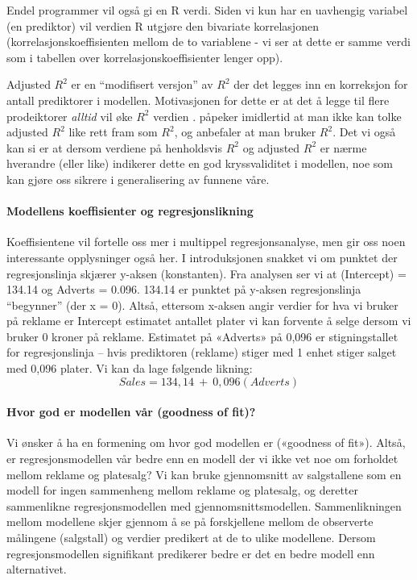 \documentclass[
]{article}
\begin{document}
Endel programmer vil også gi en R verdi. Siden vi kun har en uavhengig variabel (en prediktor) vil verdien R utgjøre den bivariate korrelasjonen (korrelasjonskoeffisienten mellom de to variablene - vi ser at dette er samme verdi som i tabellen over korrelasjonskoeffisienter lenger opp).

Adjusted \(R^{2}\) er en ``modifisert versjon'' av \(R^{2}\) der det legges inn en korreksjon for antall prediktorer i modellen. Motivasjonen for dette er at det å legge til flere prodeiktorer \emph{alltid} vil øke \(R^{2}\) verdien \citep{navarroLearningStatisticsJamovi2019a}. \citet{navarroLearningStatisticsJamovi2019a} påpeker imidlertid at man ikke kan tolke adjusted \(R^{2}\) like rett fram som \(R^{2}\), og anbefaler at man bruker \(R^{2}\). Det vi også kan si er at dersom verdiene på henholdsvis \(R^{2}\) og adjusted \(R^{2}\) er nærme hverandre (eller like) indikerer dette en god kryssvaliditet i modellen, noe som kan gjøre oss sikrere i generalisering av funnene våre.

\hypertarget{modellens-koeffisienter-og-regresjonslikning}{%
\paragraph{Modellens koeffisienter og regresjonslikning}\label{modellens-koeffisienter-og-regresjonslikning}}

Koeffisientene vil fortelle oss mer i multippel regresjonsanalyse, men gir oss noen interessante opplysninger også her. I introduksjonen snakket vi om punktet der regresjonslinja skjærer y-aksen (konstanten). Fra analysen ser vi at (Intercept) = 134.14 og Adverts = 0.096. 134.14 er punktet på y-aksen regresjonslinja ``begynner'' (der x = 0). Altså, ettersom x-aksen angir verdier for hva vi bruker på reklame er Intercept estimatet antallet plater vi kan forvente å selge dersom vi bruker 0 kroner på reklame. Estimatet på «Adverts» på 0,096 er stigningstallet for regresjonslinja -- hvis prediktoren (reklame) stiger med 1 enhet stiger salget med 0,096 plater. Vi kan da lage følgende likning: \[ Sales=134,14\:+\:0,096\left(Adverts\right) \]

\hypertarget{hvor-god-er-modellen-vuxe5r-goodness-of-fit}{%
\paragraph{Hvor god er modellen vår (goodness of fit)?}\label{hvor-god-er-modellen-vuxe5r-goodness-of-fit}}

Vi ønsker å ha en formening om hvor god modellen er («goodness of fit»). Altså, er regresjonsmodellen vår bedre enn en modell der vi ikke vet noe om forholdet mellom reklame og platesalg? Vi kan bruke gjennomsnitt av salgstallene som en modell for ingen sammenheng mellom reklame og platesalg, og deretter sammenlikne regresjonsmodellen med gjennomsnittsmodellen. Sammenlikningen mellom modellene skjer gjennom å se på forskjellene mellom de observerte målingene (salgstall) og verdier predikert at de to ulike modellene. Dersom regresjonsmodellen signifikant predikerer bedre er det en bedre modell enn alternativet.
\end{document}
